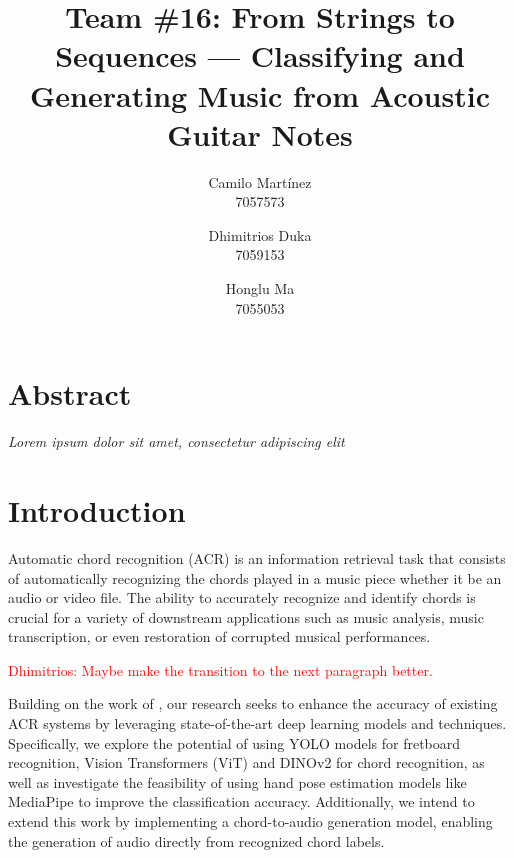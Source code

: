 \documentclass[10pt,twocolumn,letterpaper]{article}
\begin{document}
\newcommand{\dhimitrios}[1]{\textcolor{red}{Dhimitrios: #1}}

\title{Team \#16: From Strings to Sequences --- Classifying and Generating Music from Acoustic Guitar Notes}


\author{
  Camilo Martínez\\
  7057573\\
  \and
  Dhimitrios Duka\\
  7059153\\
  \and
  Honglu Ma\\
  7055053\\
}
\maketitle

\section{Abstract}
\emph{Lorem ipsum dolor sit amet, consectetur adipiscing elit}

\section{Introduction}
Automatic chord recognition (ACR) is an information retrieval task that consists of automatically recognizing the chords played in a music piece whether it be an audio or video file. The ability to accurately recognize and identify chords is crucial for a variety of downstream applications such as music analysis, music transcription, or even restoration of corrupted musical performances. 

\dhimitrios{Maybe make the transition to the next paragraph better.}

Building on the work of \cite{Kristian_Zaman_Tenoyo_Jodhinata_2024}, our research seeks to enhance the accuracy of existing ACR systems by leveraging state-of-the-art deep learning models and techniques. Specifically, we explore the potential of using YOLO \cite{redmon2016you} models for fretboard recognition, Vision Transformers (ViT) \cite{dosovitskiy2020image} and DINOv2 \cite{oquab2023dinov2} for chord recognition, as well as investigate the feasibility of using hand pose estimation models like MediaPipe \cite{zhang2020mediapipe} to improve the classification accuracy. Additionally, we intend to extend this work by implementing a chord-to-audio generation model, enabling the generation of audio directly from recognized chord labels.
\end{document}
